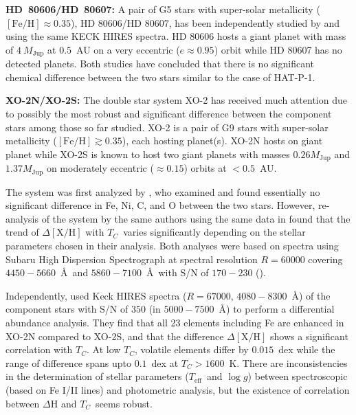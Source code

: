 \documentclass[manuscript]{aastex6}
\newcommand*\elem[1]{\ensuremath{\mathrm{#1}}}
\newcommand*\elemH[1]{\ensuremath{[\mathrm{#1}/\elem{H}]}}
\newcommand*\teff{\ensuremath{T_\mathrm{eff}}}
\newcommand*\logg{\ensuremath{\log{g}}}
\newcommand*{\feh}{\ensuremath{\elemH{Fe}}}
\newcommand{\Tcondens}{\ensuremath{T_C}}
\newcommand{\mjupiter}{\ensuremath{M_\mathrm{Jup}}}
\begin{document}
{\bf HD~80606/HD~80607:}
A pair of G5 stars with super-solar metallicity ($\feh \approx 0.35$),
HD 80606/HD 80607, has been independently studied by
\citealt{Saffe:2015aa} and \citealt{Mack:2016aa} using the same KECK HIRES
spectra. HD 80606 hosts a giant planet with mass of $4~\mjupiter$ at $0.5$~AU
on a very eccentric ($e\approx0.95$) orbit while HD 80607 has no detected
planets.
Both studies have concluded that there is no significant
chemical difference between the two stars similar to the case of HAT-P-1.

{\bf XO-2N/XO-2S:}
The double star system XO-2 has received much attention due to
possibly the most robust and significant difference between the component stars
among those so far studied.
XO-2 is a pair of G9 stars with super-solar metallicity ($\feh \gtrsim 0.35$),
each hosting planet(s).
XO-2N hosts on giant planet while XO-2S is known to host two giant planets with
masses $0.26 \mjupiter$ and $1.37 \mjupiter$ on moderately eccentric ($\approx
0.15$) orbits at $<0.5$~AU.

The system was first analyzed by \citealt{Teske:2013aa}, who examined and found
essentially no significant difference in Fe, Ni, C, and O between the two
stars.
However, re-analysis of the system by the same authors using the same data in
\citealt{Teske:2015aa} found that the trend of $\Delta\elemH{X}$ with
\Tcondens\ varies significantly depending on the stellar parameters chosen in
their analysis. Both analyses were based on spectra
using Subaru High Dispersion Spectrograph at spectral resolution $R=60000$
covering $4450-5660$~\AA\ and $5860-7100$~\AA\ with S/N of $170-230$
(\citealt{Teske:2013aa}).

Independently, \citealt{Ramirez:2015aa} used Keck HIRES spectra ($R=67000$,
$4080-8300$~\AA) of the component stars with S/N of $350$ (in $5000-7500$~\AA)
to perform a differential abundance analysis.
They find that all 23 elements including Fe are enhanced in XO-2N
compared to XO-2S, and that the difference $\Delta\elemH{X}$ shows
a significant correlation with \Tcondens.
At low \Tcondens, volatile elements differ by $0.015$~dex
while the range of difference spans upto $0.1$~dex at $\Tcondens>1600$~K.
There are inconsistencies in the determination of stellar parameters
(\teff\ and \logg) between spectroscopic (based on Fe I/II lines)
and photometric analysis,
but the existence of correlation between $\Delta\elem{H}$ and
\Tcondens\ seems robust.
\end{document}

